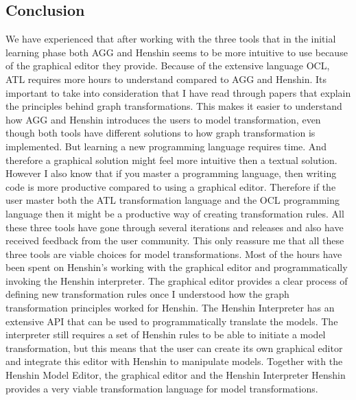 \documentclass[pdftex,11pt,a4paper]{article}
\begin{document}
\subsection{Conclusion}

We have experienced that after working with the three tools that in the initial
learning phase both AGG and Henshin seems to be more intuitive to use because of the
graphical editor they provide. Because of the extensive language OCL, ATL
requires more hours to understand compared to AGG and Henshin. Its important to
take into consideration that I have read through papers that explain the
principles behind graph transformations. This makes it easier to understand how
AGG and Henshin introduces the users to model transformation, even though both
tools have different solutions to how graph transformation is implemented. But
learning a new programming language requires time. And therefore a graphical
solution might feel more intuitive then a textual solution. However I also know
that if you master a programming language, then writing code is more productive
compared to using a graphical editor. Therefore if the user master both the ATL
transformation language and the OCL programming language then it might be a
productive way of creating transformation rules. All these three tools have gone
through several iterations and releases and also have received feedback from the
user community. This only reassure me that all these three tools are viable
choices for model transformations. Most of the hours have been spent on
Henshin's working with the graphical editor and programmatically
invoking the Henshin interpreter. The graphical editor provides a clear
process of defining new transformation rules once I understood how the graph
transformation principles worked for Henshin. The Henshin Interpreter has
an extensive API that can be used to programmatically translate the
models. The interpreter still requires a set of Henshin rules to be able to
initiate a model transformation, but this means that the user can create its own
graphical editor and integrate this editor with Henshin to manipulate models.
Together with the Henshin Model Editor, the graphical editor and the Henshin
Interpreter Henshin provides a very viable transformation language for model
transformations.

\noindent 

 

\end{document}
